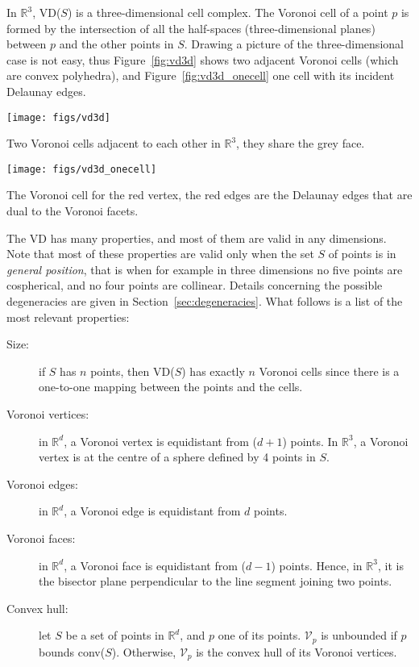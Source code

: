 %

In $\mathbb{R}^3$, VD($S$) is a three-dimensional cell complex. 
The Voronoi cell of a point $p$ is formed by the intersection of all the half-spaces (three-dimensional planes) between $p$ and the other points in $S$. 
Drawing a picture of the three-dimensional case is not easy, thus Figure~\ref{fig:vd3d} shows two adjacent Voronoi cells (which are convex polyhedra), and Figure~\ref{fig:vd3d_onecell} one cell with its incident Delaunay edges.
\begin{marginfigure}
  \centering
  \texttt{[image: figs/vd3d]}
  \caption{Two Voronoi cells adjacent to each other in $\mathbb{R}^3$, they share the grey face.}%
\label{fig:vd3d}
\end{marginfigure}
\begin{marginfigure}
  \centering
  \texttt{[image: figs/vd3d\_onecell]}
  \caption{The Voronoi cell for the red vertex, the red edges are the Delaunay edges that are dual to the Voronoi facets.}%
\label{fig:vd3d_onecell}
\end{marginfigure}

%

The VD has many properties, and most of them are valid in any dimensions. 
Note that most of these properties are valid only when the set $S$ of points is in \emph{general position}, that is when for example in three dimensions no five points are cospherical, and no four points are collinear. 
Details concerning the possible degeneracies are given in Section~\ref{sec:degeneracies}. 
What follows is a list of the most relevant properties:
\begin{description}
  \item[Size:] if $S$ has $n$ points, then VD($S$) has exactly $n$ Voronoi cells since there is a one-to-one mapping between the points and the cells.
  \item[Voronoi vertices:] in $\mathbb{R}^d$, a Voronoi vertex is equidistant from ($d+1$) points. In $\mathbb{R}^3$, a Voronoi vertex is at the centre of a sphere defined by 4 points in $S$.
  \item[Voronoi edges:] in $\mathbb{R}^d$, a Voronoi edge is equidistant from $d$ points.
  \item[Voronoi faces:] in $\mathbb{R}^d$, a Voronoi face is equidistant from ($d-1$) points. Hence, in $\mathbb{R}^3$, it is the bisector plane perpendicular to the line segment joining two points.
  \item[Convex hull:] let $S$ be a set of points in $\mathbb{R}^d$, and $p$ one of its points. $\mathcal{V}_{p}$ is unbounded if $p$ bounds conv($S$). Otherwise, $\mathcal{V}_{p}$ is the convex hull of its Voronoi vertices. 
\end{description}


